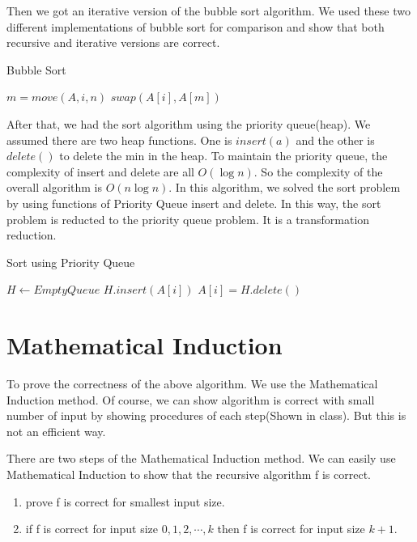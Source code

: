 \documentclass[usletter]{article}
\begin{document}
Then we got an iterative version of the bubble sort algorithm. We used these two different implementations of bubble sort  for comparison and show that both recursive and iterative versions are correct.
\begin{algorithm}
\caption{Bubble Sort}
\begin{algorithmic}[1]
	\State $m = move(A,i,n)$
	\State $swap(A[i],A[m])$
\EndFor
\EndProcedure
\end{algorithmic}
\end{algorithm}

After that, we had the sort algorithm using the priority queue(heap). We assumed there are two heap functions.
One is $insert(a)$ and the other is $delete()$ to delete the min in the heap. To maintain the priority queue, the complexity 
of insert and delete are all $O(\log{}n)$. So the complexity of the overall algorithm is $O(n\log{}n)$. In this algorithm, we solved the
sort problem by using functions of Priority Queue insert and delete. In this way, the sort problem is reducted to the priority queue
problem. It is a transformation reduction.

\begin{algorithm}
\caption{Sort using Priority Queue}  
\begin{algorithmic}[1]
\State $H \gets EmptyQueue$
        \State $H.insert(A[i])$
\EndFor
{}
        \State $A[i] = H.delete()$
\EndFor
\EndProcedure
\end{algorithmic}
\end{algorithm}

\section{Mathematical Induction}
\noindent
To prove the correctness of the above algorithm. We use the Mathematical Induction method. Of course, we can show algorithm is correct with 
small number of input by showing procedures of each step(Shown in class). But this is not an efficient way. 

There are two steps of the Mathematical Induction method. We can easily use Mathematical Induction to show that the recursive algorithm f is correct.
\begin{enumerate}
  \item prove f is correct for smallest input size.
  \item if f is correct for input size $0,1,2, \cdots, k$ then f is correct for input size $k+1$.
\end{enumerate}
\end{document}
